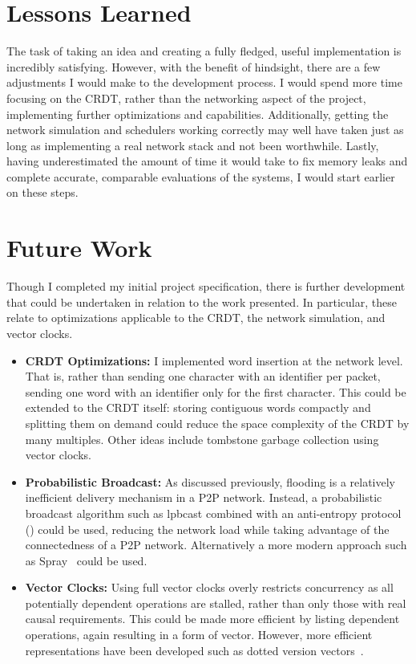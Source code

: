 \documentclass[12pt,a4paper,twoside,openright]{report}
\begin{document}
\section{Lessons Learned}
The task of taking an idea and creating a fully fledged, useful implementation is incredibly satisfying. However, with the benefit of hindsight, there are a few adjustments I would make to the development process. I would spend more time focusing on the CRDT, rather than the networking aspect of the project, implementing further optimizations and capabilities. Additionally, getting the network simulation and schedulers working correctly may well have taken just as long as implementing a real network stack and not been worthwhile. Lastly, having underestimated the amount of time it would take to fix memory leaks and complete accurate, comparable evaluations of the systems, I would start earlier on these steps.


\section{Future Work} \label{sec:futurework}

Though I completed my initial project specification, there is further development that could be undertaken in relation to the work presented. In particular, these relate to optimizations applicable to the CRDT, the network simulation, and vector clocks.

\begin{itemize}
	\item{\textbf{CRDT Optimizations: } I implemented word insertion at the network level. That is, rather than sending one character with an identifier per packet, sending one word with an identifier only for the first character. This could be extended to the CRDT itself: storing contiguous words compactly and splitting them on demand could reduce the space complexity of the CRDT by many multiples. Other ideas include tombstone garbage collection using vector clocks.}
	
	\item{\textbf{Probabilistic Broadcast: } As discussed previously, flooding is a relatively inefficient delivery mechanism in a P2P network. Instead, a probabilistic broadcast algorithm such as lpbcast combined with an anti-entropy protocol (\cite{eugster2003lightweight}) could be used, reducing the network load while taking advantage of the connectedness of a P2P network. Alternatively a more modern approach such as Spray~\cite{nedelec2015spray} could be used.}

	\item{\textbf{Vector Clocks: } Using full vector clocks overly restricts concurrency as all potentially dependent operations are stalled, rather than only those with real causal requirements. This could be made more efficient by listing dependent operations, again resulting in a form of vector. However, more efficient representations have been developed such as dotted version vectors~\cite{preguicca2010dotted}.}

\end{itemize}
\end{document}
